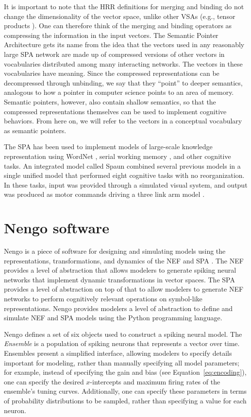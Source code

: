It is important to note that
the HRR definitions for merging and binding
do not change the dimensionality
of the vector space, unlike other VSAs
(e.g., tensor products \citet{smolensky1990}).
One can therefore think of the
merging and binding operators
as compressing the information
in the input vectors.
The Semantic Pointer Architecture
gets its name from the idea that
the vectors used
in any reasonably large SPA network
are made up of compressed versions
of other vectors in vocabularies
distributed among many interacting networks.
The vectors in these vocabularies
have meaning.
Since the compressed representations
can be decompressed through unbinding,
we say that they ``point''
to deeper semantics,
analogous to how a pointer in computer science
points to an area of memory.
Semantic pointers, however,
also contain shallow semantics,
so that the compressed
representations themselves
can be used to implement cognitive behaviors.
From here on, we will refer to
the vectors in a conceptual vocabulary
as semantic pointers.

The SPA has been used to implement
models of large-scale knowledge representation
using WordNet \citep{crawford2014},
serial working memory \citep{choo2010},
and other cognitive tasks.
An integrated model called Spaun
combined several previous models
in a single unified model
that performed eight cognitive tasks
with no reorganization.
In these tasks, input was provided
through a simulated visual system,
and output was produced
as motor commands driving
a three link arm model
\citep{eliasmith2012,eliasmith2013}.

\section{Nengo software}
\label{sec:nengo}

Nengo is a piece of software
for designing and simulating
models using the representations,
transformations, and dynamics
of the NEF and SPA
\citep{bekolay2013}.
The NEF provides a level of abstraction
that allows modelers to generate
spiking neural networks
that implement dynamic transformations
in vector spaces.
The SPA provides a level of abstraction
on top of that
to allow modelers to generate
NEF networks to perform
cognitively relevant operations
on symbol-like representations.
Nengo provides modelers
a level of abstraction to
define and simulate NEF and SPA models
using the Python programming language.

Nengo defines a set of six objects
used to construct a spiking neural model.
The \textit{Ensemble} is
a population of spiking neurons
that represents a vector over time.
Ensembles present a simplified interface,
allowing modelers to specify
details important for modeling,
rather than manually specifying
all model parameters;
for example, instead of specifying
the gain and bias
(see Equation~\eqref{eq:encoding}),
one can specify the desired
$x$-intercepts and maximum firing rates
of the ensemble's tuning curves.
Additionally, one can specify
these parameters in terms of
probability distributions
to be sampled,
rather than specifying a value for each neuron.

